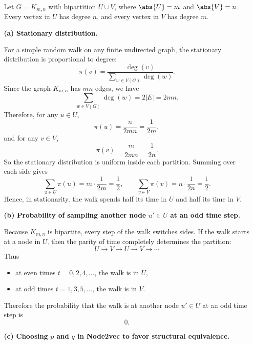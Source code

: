 \documentclass{article}
\begin{document}
\begin{tcolorbox}[colback=white, colframe=black!75, breakable, title=\textbf{Solution to Exercise 2}]
Let $G=K_{m,n}$ with bipartition $U\cup V$, where $\abs{U}=m$ and $\abs{V}=n$. Every vertex in $U$ has degree $n$, and every vertex in $V$ has degree $m$.

\medskip
\textbf{(a) Stationary distribution.}

For a simple random walk on any finite undirected graph, the stationary distribution is proportional to degree:
\[
\pi(v)=\frac{\deg(v)}{\sum_{w\in V(G)}\deg(w)}.
\]
Since the graph $K_{m,n}$ has $mn$ edges, we have
\[
\sum_{w\in V(G)}\deg(w)=2|E|=2mn.
\]
Therefore, for any $u\in U$,
\[
\pi(u)=\frac{n}{2mn}=\frac{1}{2m},
\]
and for any $v\in V$,
\[
\pi(v)=\frac{m}{2mn}=\frac{1}{2n}.
\]
So the stationary distribution is uniform inside each partition. Summing over each side gives
\[
\sum_{u\in U}\pi(u)=m\cdot \frac{1}{2m}=\frac12,
\qquad
\sum_{v\in V}\pi(v)=n\cdot \frac{1}{2n}=\frac12.
\]
Hence, in stationarity, the walk spends half its time in $U$ and half its time in $V$.

\medskip
\textbf{(b) Probability of sampling another node $u'\in U$ at an odd time step.}

Because $K_{m,n}$ is bipartite, every step of the walk switches sides. If the walk starts at a node in $U$, then the parity of time completely determines the partition:
\[
U\to V\to U\to V\to \cdots
\]
Thus
\begin{itemize}
    \item at even times $t=0,2,4,\dots$, the walk is in $U$,
    \item at odd times $t=1,3,5,\dots$, the walk is in $V$.
\end{itemize}
Therefore the probability that the walk is at another node $u'\in U$ at an odd time step is
\[
\boxed{0.}
\]

\medskip
\textbf{(c) Choosing $p$ and $q$ in Node2vec to favor structural equivalence.}


\end{tcolorbox}
\end{document}
